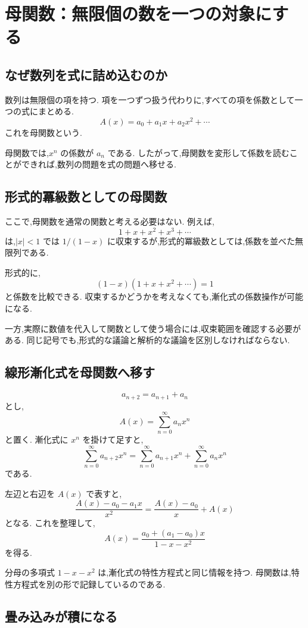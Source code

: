 
\section{母関数：無限個の数を一つの対象にする}

\subsection{なぜ数列を式に詰め込むのか}

数列は無限個の項を持つ.
項を一つずつ扱う代わりに,すべての項を係数として一つの式にまとめる.
\[
  A(x)=a_0+a_1x+a_2x^2+\cdots
\]
これを母関数という.

母関数では,$x^n$ の係数が $a_n$ である.
したがって,母関数を変形して係数を読むことができれば,数列の問題を式の問題へ移せる.

\subsection{形式的冪級数としての母関数}

ここで,母関数を通常の関数と考える必要はない.
例えば,
\[
  1+x+x^2+x^3+\cdots
\]
は,$|x|<1$ では $1/(1-x)$ に収束するが,形式的冪級数としては,係数を並べた無限列である.

形式的に,
\[
  (1-x)(1+x+x^2+\cdots)=1
\]
と係数を比較できる.
収束するかどうかを考えなくても,漸化式の係数操作が可能になる.

一方,実際に数値を代入して関数として使う場合には,収束範囲を確認する必要がある.
同じ記号でも,形式的な議論と解析的な議論を区別しなければならない.

\subsection{線形漸化式を母関数へ移す}

\[
  a_{n+2}=a_{n+1}+a_n
\]
とし,
\[
  A(x)=\sum_{n=0}^{\infty}a_nx^n
\]
と置く.
漸化式に $x^n$ を掛けて足すと,
\[
  \sum_{n=0}^{\infty}a_{n+2}x^n
  =
  \sum_{n=0}^{\infty}a_{n+1}x^n
  +
  \sum_{n=0}^{\infty}a_nx^n
\]
である.

左辺と右辺を $A(x)$ で表すと,
\[
  \frac{A(x)-a_0-a_1x}{x^2}
  =
  \frac{A(x)-a_0}{x}+A(x)
\]
となる.
これを整理して,
\[
  A(x)=\frac{a_0+(a_1-a_0)x}{1-x-x^2}
\]
を得る.

分母の多項式 $1-x-x^2$ は,漸化式の特性方程式と同じ情報を持つ.
母関数は,特性方程式を別の形で記録しているのである.

\subsection{畳み込みが積になる}


